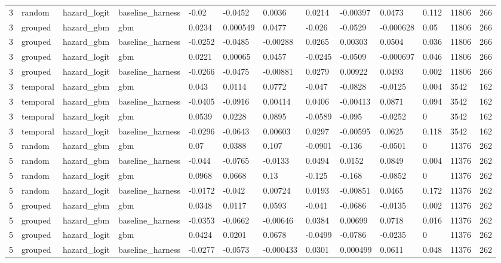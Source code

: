 \begin{tabular}{lllllllllllll}
3 & random & hazard\_logit & baseline\_harness & -0.02 & -0.0452 & 0.0036 & 0.0214 & -0.00397 & 0.0473 & 0.112 & 11806 & 266 \\
3 & grouped & hazard\_gbm & gbm & 0.0234 & 0.000549 & 0.0477 & -0.026 & -0.0529 & -0.000628 & 0.05 & 11806 & 266 \\
3 & grouped & hazard\_gbm & baseline\_harness & -0.0252 & -0.0485 & -0.00288 & 0.0265 & 0.00303 & 0.0504 & 0.036 & 11806 & 266 \\
3 & grouped & hazard\_logit & gbm & 0.0221 & 0.00065 & 0.0457 & -0.0245 & -0.0509 & -0.000697 & 0.046 & 11806 & 266 \\
3 & grouped & hazard\_logit & baseline\_harness & -0.0266 & -0.0475 & -0.00881 & 0.0279 & 0.00922 & 0.0493 & 0.002 & 11806 & 266 \\
3 & temporal & hazard\_gbm & gbm & 0.043 & 0.0114 & 0.0772 & -0.047 & -0.0828 & -0.0125 & 0.004 & 3542 & 162 \\
3 & temporal & hazard\_gbm & baseline\_harness & -0.0405 & -0.0916 & 0.00414 & 0.0406 & -0.00413 & 0.0871 & 0.094 & 3542 & 162 \\
3 & temporal & hazard\_logit & gbm & 0.0539 & 0.0228 & 0.0895 & -0.0589 & -0.095 & -0.0252 & 0 & 3542 & 162 \\
3 & temporal & hazard\_logit & baseline\_harness & -0.0296 & -0.0643 & 0.00603 & 0.0297 & -0.00595 & 0.0625 & 0.118 & 3542 & 162 \\
5 & random & hazard\_gbm & gbm & 0.07 & 0.0388 & 0.107 & -0.0901 & -0.136 & -0.0501 & 0 & 11376 & 262 \\
5 & random & hazard\_gbm & baseline\_harness & -0.044 & -0.0765 & -0.0133 & 0.0494 & 0.0152 & 0.0849 & 0.004 & 11376 & 262 \\
5 & random & hazard\_logit & gbm & 0.0968 & 0.0668 & 0.13 & -0.125 & -0.168 & -0.0852 & 0 & 11376 & 262 \\
5 & random & hazard\_logit & baseline\_harness & -0.0172 & -0.042 & 0.00724 & 0.0193 & -0.00851 & 0.0465 & 0.172 & 11376 & 262 \\
5 & grouped & hazard\_gbm & gbm & 0.0348 & 0.0117 & 0.0593 & -0.041 & -0.0686 & -0.0135 & 0.002 & 11376 & 262 \\
5 & grouped & hazard\_gbm & baseline\_harness & -0.0353 & -0.0662 & -0.00646 & 0.0384 & 0.00699 & 0.0718 & 0.016 & 11376 & 262 \\
5 & grouped & hazard\_logit & gbm & 0.0424 & 0.0201 & 0.0678 & -0.0499 & -0.0786 & -0.0235 & 0 & 11376 & 262 \\
5 & grouped & hazard\_logit & baseline\_harness & -0.0277 & -0.0573 & -0.000433 & 0.0301 & 0.000499 & 0.0611 & 0.048 & 11376 & 262 \\

\end{tabular}
